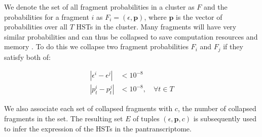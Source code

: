 \documentclass[11pt]{ucthesis}
\begin{document}
	
We denote the set of all fragment probabilities in a cluster as $F$ and the probabilities for a fragment $i$ as ${F_i=\left(\epsilon,\textbf{p}\right)}$, where $\textbf{p}$ is the vector of probabilities over all $T$ HSTs in the cluster. Many fragments will have very similar probabilities and can thus be collapsed to save computation resources and memory \cite{nicolae2011estimation,patro2017salmon}. To do this we collapse two fragment probabilities $F_i$ and $F_j$ if they satisfy both of:


\begin{equation}
\begin{aligned}
    \left|\epsilon^{i}-\epsilon^{j}\right| &< 10^{-8} \\	\left|p_t^{i}-p_t^{j}\right| &< 10^{-8},\quad\forall t\in T
\end{aligned}
\end{equation}

We also associate each set of collapsed fragments with $c$, the number of collapsed fragments in the set. The resulting set $E$ of tuples ${\left(\epsilon, \textbf{p}, c\right)}$ is subsequently used to infer the expression of the HSTs in the pantranscriptome.

\end{document}
